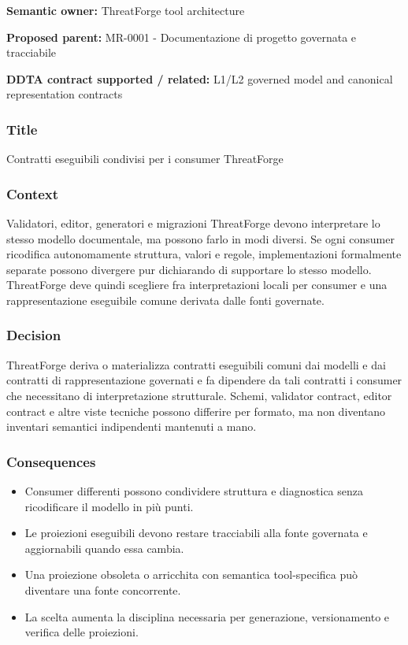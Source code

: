 \documentclass[
  10pt,
  a4paper,
]{article}
\providecommand{\tightlist}{%
  \setlength{\itemsep}{0pt}\setlength{\parskip}{0pt}}
\begin{document}
\textbf{Semantic owner:} ThreatForge tool architecture

\textbf{Proposed parent:} MR-0001 - Documentazione di progetto governata
e tracciabile

\textbf{DDTA contract supported / related:} L1/L2 governed model and
canonical representation contracts

\subsubsection{Title}\label{title-5}

Contratti eseguibili condivisi per i consumer ThreatForge

\subsubsection{Context}\label{context-5}

Validatori, editor, generatori e migrazioni ThreatForge devono
interpretare lo stesso modello documentale, ma possono farlo in modi
diversi. Se ogni consumer ricodifica autonomamente struttura, valori e
regole, implementazioni formalmente separate possono divergere pur
dichiarando di supportare lo stesso modello. ThreatForge deve quindi
scegliere fra interpretazioni locali per consumer e una rappresentazione
eseguibile comune derivata dalle fonti governate.

\subsubsection{Decision}\label{decision-5}

ThreatForge deriva o materializza contratti eseguibili comuni dai
modelli e dai contratti di rappresentazione governati e fa dipendere da
tali contratti i consumer che necessitano di interpretazione
strutturale. Schemi, validator contract, editor contract e altre viste
tecniche possono differire per formato, ma non diventano inventari
semantici indipendenti mantenuti a mano.

\subsubsection{Consequences}\label{consequences-5}

\begin{itemize}
\tightlist
\item
  Consumer differenti possono condividere struttura e diagnostica senza
  ricodificare il modello in più punti.
\item
  Le proiezioni eseguibili devono restare tracciabili alla fonte
  governata e aggiornabili quando essa cambia.
\item
  Una proiezione obsoleta o arricchita con semantica tool-specifica può
  diventare una fonte concorrente.
\item
  La scelta aumenta la disciplina necessaria per generazione,
  versionamento e verifica delle proiezioni.
\end{itemize}
\end{document}
